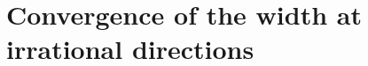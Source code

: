 \documentclass[AHL,Unicode,longabstracts,published]{cedram}
\newcommand{\Z}{\mathbb{Z}}
\newcommand{\R}{\mathbb{R}}
\begin{document}

\section{Convergence of the width at irrational directions} \label{sec:uniform}
\end{document}
